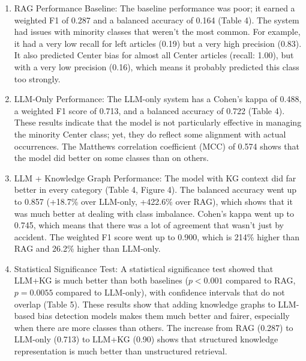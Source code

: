 \documentclass[11pt]{article}
\begin{document}
\begin{enumerate}
    \item{RAG Performance Baseline}:  The baseline performance was poor; it earned a weighted F1 of 0.287 and a balanced accuracy of 0.164 (Table 4). The system had issues with minority classes that weren't the most common. For example, it had a very low recall for left articles (0.19) but a very high precision (0.83). It also predicted Center bias for almost all Center articles (recall: 1.00), but with a very low precision (0.16), which means it probably predicted this class too strongly.

\item {LLM-Only Performance}: The LLM-only system has a Cohen's kappa of 0.488, a weighted F1 score of 0.713, and a balanced accuracy of 0.722 (Table 4). These results indicate that the model is not particularly effective in managing the minority Center class; yet, they do reflect some alignment with actual occurrences. The Matthews correlation coefficient (MCC) of 0.574 shows that the model did better on some classes than on others.

 
\item {LLM + Knowledge Graph Performance}: The model with KG context did far better in every category (Table 4, Figure 4). The balanced accuracy went up to 0.857 (+18.7\% over LLM-only, +422.6\% over RAG), which shows that it was much better at dealing with class imbalance. Cohen's kappa went up to 0.745, which means that there was a lot of agreement that wasn't just by accident. The weighted F1 score went up to 0.900, which is 214\% higher than RAG and 26.2\% higher than LLM-only.

\item {Statistical Significance Test}: A statistical significance test showed that LLM+KG is much better than both baselines ($p<0.001$ compared to RAG, $p=0.0055$ compared to LLM-only), with confidence intervals that do not overlap (Table 5). These results show that adding knowledge graphs to LLM-based bias detection models makes them much better and fairer, especially when there are more classes than others. The increase from RAG (0.287) to LLM-only (0.713) to LLM+KG (0.90) shows that structured knowledge representation is much better than unstructured retrieval.

\end{enumerate}
\end{document}
